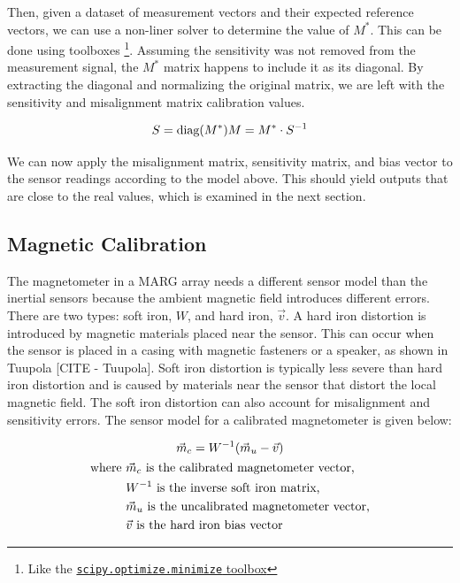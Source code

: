 Then, given a dataset of measurement vectors and their expected reference vectors, we can use a non-liner solver to determine the value of $M^*$. This can be done using toolboxes \footnote[4]{Like the \href{https://docs.scipy.org/doc/scipy/reference/generated/scipy.optimize.minimize.html}{\lstinline{scipy.optimize.minimize} toolbox}}. 
Assuming the sensitivity was not removed from the measurement signal, the $M^*$ matrix happens to include it as its diagonal. 
By extracting the diagonal and normalizing the original matrix, we are left with the sensitivity and misalignment matrix calibration values.

\begin{equation*}
    S = \text{diag}(M^*) \\
    M=M^* \cdot S^{-1}
\end{equation*}

We can now apply the misalignment matrix, sensitivity matrix, and bias vector to the sensor readings according to the model above. This should yield outputs that are close to the real values, which is examined in the next section.

\subsection{Magnetic Calibration}
The magnetometer in a MARG array needs a different sensor model than the inertial sensors because the ambient magnetic field introduces different errors. 
There are two types: soft iron, $W$, and hard iron, $\vec{v}$. 
A hard iron distortion is introduced by magnetic materials placed near the sensor. 
This can occur when the sensor is placed in a casing with magnetic fasteners or a speaker, as shown in Tuupola [CITE - Tuupola]. 
Soft iron distortion is typically less severe than hard iron distortion and is caused by materials near the sensor that distort the local magnetic field. 
The soft iron distortion can also account for misalignment and sensitivity errors. 
The sensor model for a calibrated magnetometer is given below:

\begin{gather}
    \vec{m}_c=W^{-1}(\vec{m}_u-\vec{v}) \\
    \begin{aligned}
        \text{where } &\vec{m}_c \text{ is the calibrated magnetometer vector,} \\
        &W^{-1} \text{ is the inverse soft iron matrix,}\\
        &\vec{m}_u \text{ is the uncalibrated magnetometer vector,} \\
        &\vec{v} \text{ is the hard iron bias vector}
    \end{aligned} \notag
\end{gather}

